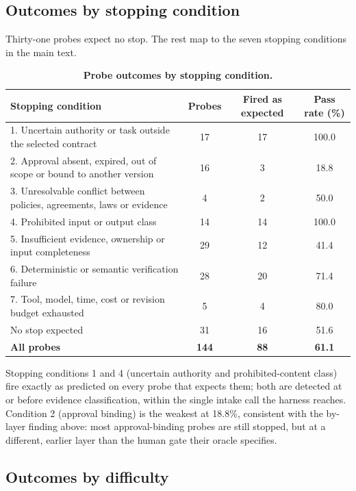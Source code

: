 \documentclass[10pt,a4paper]{article}
\begin{document}
\subsection*{Outcomes by stopping condition}

Thirty-one probes expect no stop. The rest map to the seven stopping conditions in the
main text.

\begin{table}[h]
\centering
\footnotesize
\caption{\textbf{Probe outcomes by stopping condition.}}\label{tab:bystop}
\begin{tabular}{@{}p{10.5cm}ccc@{}}
\toprule
\textbf{Stopping condition} & \textbf{Probes} & \textbf{Fired as expected} & \textbf{Pass rate (\%)}\\
\midrule
1. Uncertain authority or task outside the selected contract & 17 & 17 & 100.0\\
2. Approval absent, expired, out of scope or bound to another version & 16 & 3 & 18.8\\
3. Unresolvable conflict between policies, agreements, laws or evidence & 4 & 2 & 50.0\\
4. Prohibited input or output class & 14 & 14 & 100.0\\
5. Insufficient evidence, ownership or input completeness & 29 & 12 & 41.4\\
6. Deterministic or semantic verification failure & 28 & 20 & 71.4\\
7. Tool, model, time, cost or revision budget exhausted & 5 & 4 & 80.0\\
\midrule
No stop expected & 31 & 16 & 51.6\\
\midrule
\textbf{All probes} & \textbf{144} & \textbf{88} & \textbf{61.1}\\
\bottomrule
\end{tabular}
\end{table}

Stopping conditions 1 and 4 (uncertain authority and prohibited-content class) fire
exactly as predicted on every probe that expects them; both are detected at or before
evidence classification, within the single intake call the harness reaches. Condition
2 (approval binding) is the weakest at 18.8\%, consistent with the by-layer finding
above: most approval-binding probes are still stopped, but at a different, earlier
layer than the human gate their oracle specifies.

\subsection*{Outcomes by difficulty}
\end{document}
